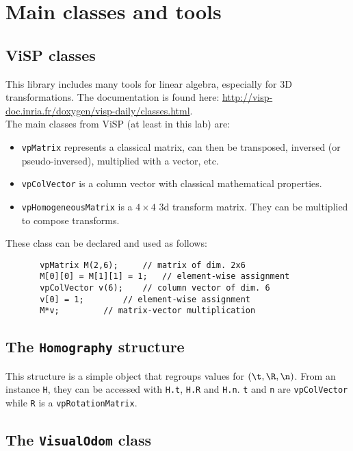 \documentclass{ecnreport}
\begin{document}
\appendix
\section{Main classes and tools}\label{sec:classes}

\subsection{ViSP classes}

This library includes many tools for linear algebra, especially for 3D transformations. 
The documentation is found here: \url{http://visp-doc.inria.fr/doxygen/visp-daily/classes.html}.\\
The main classes from ViSP (at least in this lab) are:
\begin{itemize}
\item \texttt{vpMatrix} represents a classical matrix, can then be transposed, inversed (or pseudo-inversed), multiplied with a vector, etc.
\item \texttt{vpColVector} is a column vector with classical mathematical properties.
\item \texttt{vpHomogeneousMatrix} is a $4\times 4$ 3d transform matrix. They can be multiplied to compose transforms.
\end{itemize}
These class can be declared and used as follows:
\begin{center}\cppstyle
\begin{lstlisting}
       vpMatrix M(2,6); 	// matrix of dim. 2x6
       M[0][0] = M[1][1] = 1;	// element-wise assignment
       vpColVector v(6);	// column vector of dim. 6
       v[0] = 1;		// element-wise assignment
       M*v;			// matrix-vector multiplication
\end{lstlisting}
\end{center}

\subsection{The \texttt{Homography} structure}
\label{sec:homog}

This structure is a simple object that regroups values for $(\t,\R,\n)$. From an instance \texttt{H}, they can be accessed with \texttt{H.t}, 
\texttt{H.R} and \texttt{H.n}. \texttt{t} and \texttt{n} are \texttt{vpColVector} while \texttt{R} is a \texttt{vpRotationMatrix}.

\subsection{The \texttt{VisualOdom} class}
\end{document}
